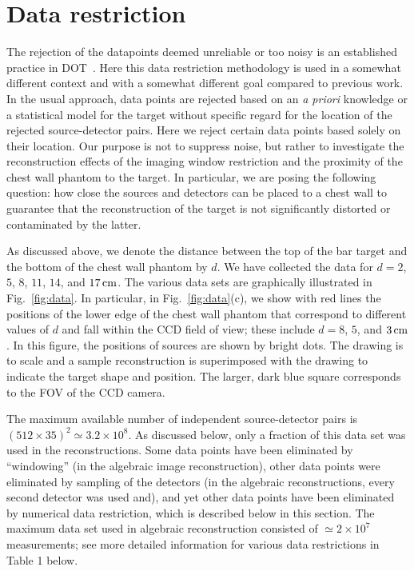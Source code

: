 \section{Data restriction}
\label{sec:data}

The rejection of the datapoints deemed unreliable or too noisy is an established practice in DOT~\cite{blasi_07_1,franceschini_07_1,roche-labarbe_10_1,orihuela-espina_10_1}. Here this data restriction methodology is used in a somewhat different context and with a somewhat different goal compared to previous work. In the usual approach, data points are rejected based on an {\em a priori} knowledge or a statistical model for the target without specific regard for the location of the rejected source-detector pairs. Here we reject certain data points based solely on their location. Our purpose is not to suppress noise, but rather to investigate the reconstruction effects of the imaging window restriction and the proximity of the chest wall phantom to the target. In particular, we are posing the following question: how close the sources and detectors can be placed to a chest wall to guarantee that the reconstruction of the target is not significantly distorted or contaminated by the latter.

As discussed above, we denote the distance between the top of the bar target and the bottom of the chest wall phantom by $d$. We have collected the data for $d=2$, $5$, $8$, $11$, $14$, and $17\,{\rm cm}$. The various data sets are graphically illustrated in Fig.~\ref{fig:data}. In particular, in Fig.~\ref{fig:data}(c), we show with red lines the positions of the lower edge of the chest wall phantom that correspond to different values of $d$ and fall within the CCD field of view; these include $d=8$, $5$, and $3\,{\rm cm}$. In this figure, the positions of sources are shown by bright dots. The drawing is to scale and a sample reconstruction is superimposed with the drawing to indicate the target shape and position. The larger, dark blue square corresponds to the FOV of the CCD camera.

The maximum available number of independent source-detector pairs is $(512\times 35)^2\simeq 3.2\times 10^8$. As discussed below, only a fraction of this data set was used in the reconstructions. Some data points have been eliminated by ``windowing'' (in the algebraic image reconstruction), other data points were eliminated by sampling of the detectors (in the algebraic reconstructions, every second detector was used and), and yet other data points have been eliminated by numerical data restriction, which is described below in this section. The maximum data set used in algebraic reconstruction consisted of $\simeq
2\times 10^7$ measurements; see more detailed information for various
data restrictions in Table 1 below.

